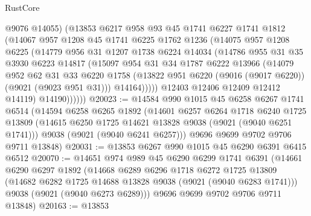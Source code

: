 \begin{lexlean}{RustCore}
\begin{coremodule}
                @9076
                @14055)
              (@13853
                @6217
                @958
                @93
                @45
                @1741
                @6227
                @1741
                @1812
                (@14067
                  @957
                  @1208
                  @45
                  @1741
                  @6225
                  @1762
                  @1236
                  (@14075
                    @957
                    @1208
                    @6225
                    (@14779
                      @956
                      @31
                      @1207
                      @1738
                      @6224
                      @14034
                      (@14786
                        @955
                        @31
                        @35
                        @3930
                        @6223
                        @14817
                        (@15097
                          @954
                          @31
                          @34
                          @1787
                          @6222
                          @13966
                          (@14079
                            @952
                            @62
                            @31
                            @33
                            @6220
                            @1758
                            (@13822 @951 @6220 (@9016 (@9017 @6220)) (@9021 (@9023 @951 @31)))
                            @14164)))))
                  @12403
                  @12406
                  @12409
                  @12412
                  @14119)
                @14190))))))
@20023 := @14584
    @990
    @1015
    @45
    @6258
    @6267
    @1741
    @6514
    (@14594
      @6258
      @6265
      @1892
      (@14601
        @6257
        @6264
        @1718
        @6240
        @1725
        @13809
        (@14615 @6250 @1725 @14621 @13828 @9038 (@9021 (@9040 @6251 @1741)))
        @9038
        (@9021 (@9040 @6241 @6257)))
      @9696
      @9699
      @9702
      @9706
      @9711
      @13848)
@20031 := @13853 @6267 @990 @1015 @45 @6290 @6391 @6415 @6512
@20070 := @14651
    @974
    @989
    @45
    @6290
    @6299
    @1741
    @6391
    (@14661
      @6290
      @6297
      @1892
      (@14668
        @6289
        @6296
        @1718
        @6272
        @1725
        @13809
        (@14682 @6282 @1725 @14688 @13828 @9038 (@9021 (@9040 @6283 @1741)))
        @9038
        (@9021 (@9040 @6273 @6289)))
      @9696
      @9699
      @9702
      @9706
      @9711
      @13848)
@20163 := @13853

\end{coremodule}
\end{lexlean}
